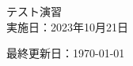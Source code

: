 \documentclass[a4paper,11pt]{jsarticle}
\begin{document}
\begin{titlepage}
  \begin{center}
    {\Huge\gt テスト演習}\\ \vspace{\baselineskip}
    \textup{\large 実施日：2023年10月21日}\\ 
  \end{center}
  \vfill
  \hfill {最終更新日：\today}
\end{titlepage}

\qPart

\calcPage

\qPart

\calcPage

\brankPage

\brankPage

\brankPage
\end{document}
